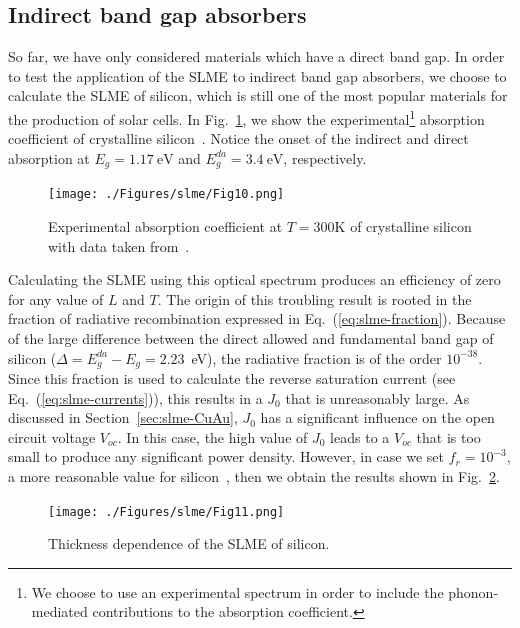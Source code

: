 \begin{refsection}
\subsection{Indirect band gap absorbers}

So far, we have only considered materials which have a direct band gap. In order to test the application of the SLME to indirect band gap absorbers, we choose to calculate the SLME of silicon, which is still one of the most popular materials for the production of solar cells. In Fig.~\ref{fig:slme-Si_expAbs}, we show the experimental\footnote{We choose to use an experimental spectrum in order to include the phonon-mediated contributions to the absorption coefficient.} absorption coefficient of crystalline silicon~\cite{green2008}. Notice the onset of the indirect and direct absorption at \mbox{$E_g = 1.17~\si{\electronvolt}$} and \mbox{$E_g^{da} = 3.4~\si{\electronvolt}$}, respectively.

\begin{figure}[htbp]
	\centering
		\texttt{[image: ./Figures/slme/Fig10.png]}
	\caption{Experimental absorption coefficient at $T = 300\si{\kelvin}$ of crystalline silicon with data taken from~\cite{green2008}.}
	\label{fig:slme-Si_expAbs}
\end{figure}

Calculating the SLME using this optical spectrum produces an efficiency of zero for any value of $L$ and $T$. The origin of this troubling result is rooted in the fraction of radiative recombination expressed in Eq.~(\ref{eq:slme-fraction}). Because of the large difference between the direct allowed and fundamental band gap of silicon ($\Delta = E_g^{da}-E_g=2.23$~\si{\electronvolt}), the radiative fraction is of the order $10^{-38}$. Since this fraction is used to calculate the reverse saturation current (see Eq.~(\ref{eq:slme-currents})), this results in a $J_0$ that is unreasonably large. As discussed in Section~\ref{sec:slme-CuAu}, $J_0$ has a significant influence on the open circuit voltage $V_{oc}$. In this case, the high value of $J_0$ leads to a $V_{oc}$ that is too small to produce any significant power density. However, in case we set \mbox{$f_r = 10^{-3}$}, a more reasonable value for silicon~\cite{Shockley1952,Trupke2003,Richter2012}, then we obtain the results shown in Fig.~\ref{fig:slme-SLME_Si}.

\begin{figure}[htbp]
	\centering
		\texttt{[image: ./Figures/slme/Fig11.png]}
	\caption{Thickness dependence of the SLME of silicon.}
	\label{fig:slme-SLME_Si}
\end{figure}


\end{refsection}

